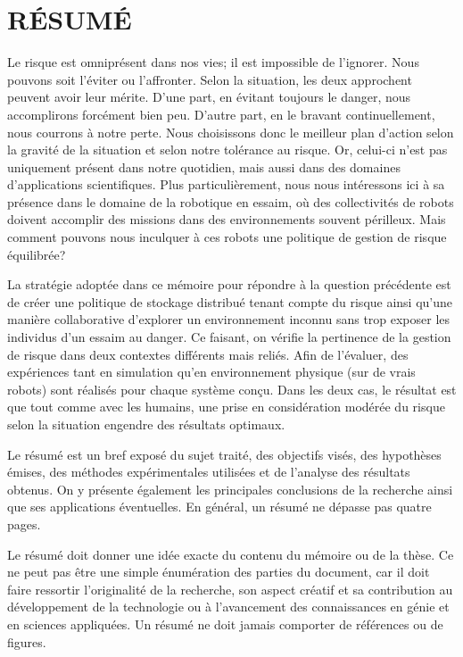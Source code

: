 %
\chapter*{RÉSUMÉ}\thispagestyle{headings}

Le risque est omniprésent dans nos vies; il est impossible de l'ignorer. Nous pouvons soit l'éviter ou l'affronter. Selon la situation, les deux approchent peuvent avoir leur mérite. D'une part, en évitant toujours le danger, nous accomplirons forcément bien peu. D'autre part, en le bravant continuellement, nous courrons à notre perte. Nous choisissons donc le meilleur plan d'action selon la gravité de la situation et selon notre tolérance au risque. Or, celui-ci n'est pas uniquement présent dans notre quotidien, mais aussi dans des domaines d'applications scientifiques. Plus particulièrement, nous nous intéressons ici à sa présence dans le domaine de la robotique en essaim, où des collectivités de robots doivent accomplir des missions dans des environnements souvent périlleux. Mais comment pouvons nous inculquer à ces robots une politique de gestion de risque équilibrée?

La stratégie adoptée dans ce mémoire pour répondre à la question précédente est de créer une politique de stockage distribué tenant compte du risque ainsi qu'une manière collaborative d'explorer un environnement inconnu sans trop exposer les individus d'un essaim au danger. Ce faisant, on vérifie la pertinence de la gestion de risque dans deux contextes différents mais reliés. Afin de l'évaluer, des expériences tant en simulation qu'en environnement physique (sur de vrais robots) sont réalisés pour chaque système conçu. Dans les deux cas, le résultat est que tout comme avec les humains, une prise en considération modérée du risque selon la situation engendre des résultats optimaux.

Le résumé est un bref exposé du sujet traité, des objectifs visés,
des hypothèses émises, des méthodes expérimentales utilisées et de
l'analyse des résultats obtenus. On y présente également les
principales conclusions de la recherche ainsi que ses applications
éventuelles. En général, un résumé ne dépasse pas quatre pages.

Le résumé doit donner une idée exacte du contenu du mémoire ou de la thèse. Ce ne
peut pas être une simple énumération des parties du document, car il
doit faire ressortir l'originalité de la recherche, son aspect
créatif et sa contribution au développement de la technologie ou à
l'avancement des connaissances en génie et en sciences appliquées.
Un résumé ne doit jamais comporter de références ou de figures.
